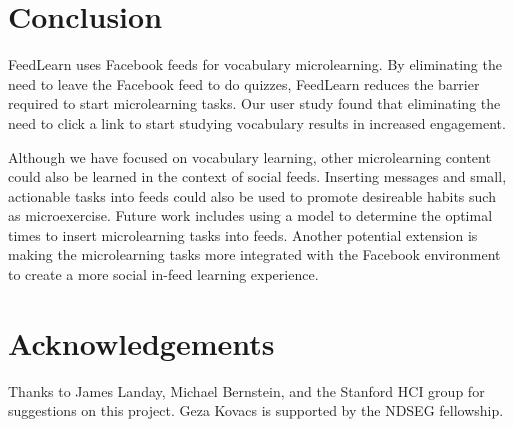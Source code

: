 \documentclass{chi-ext}
\begin{document}
\section{Conclusion}

FeedLearn uses Facebook feeds for vocabulary microlearning.
By eliminating the need to leave the Facebook feed to do quizzes, FeedLearn reduces the barrier
required to start microlearning tasks. Our user study found that eliminating the need to click a link to start studying vocabulary results in increased engagement.

Although we have focused on vocabulary learning, other microlearning content could also be learned in the context of social feeds. Inserting messages and small, actionable tasks into feeds could also be used to promote desireable habits such as microexercise. Future work includes using a model to determine the optimal times to insert microlearning tasks into feeds. Another potential extension is making the microlearning tasks more integrated with the Facebook environment to create a more social in-feed learning experience. %

\section{Acknowledgements}

Thanks to James Landay, Michael Bernstein, and the Stanford HCI group for suggestions on this project. Geza Kovacs is supported by the NDSEG fellowship.



\end{document}
